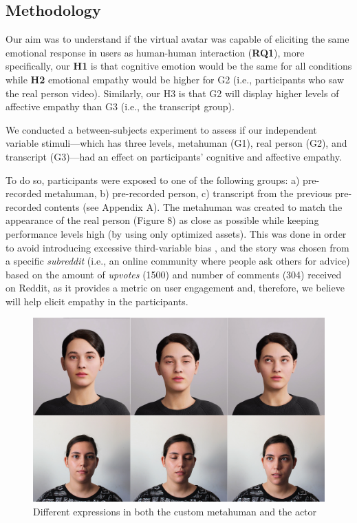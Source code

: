 \subsection{Methodology}
Our aim was to understand if the virtual avatar was capable of eliciting the same emotional response in users as human-human interaction (\textbf{RQ1}), more specifically, our \textbf{H1} is that cognitive emotion would be the same for all conditions while \textbf{H2} emotional empathy would be higher for G2 (i.e., participants who saw the real person video). Similarly, our H3 is that G2 will display higher levels of affective empathy than G3 (i.e., the transcript group).

We conducted a between-subjects experiment to assess if our independent variable stimuli---which has three levels, metahuman (G1), real person (G2), and transcript (G3)---had an effect on participants' cognitive and affective empathy.

To do so, participants were exposed to one of the following groups: a) pre-recorded metahuman, b) pre-recorded person, c) transcript from the previous pre-recorded contents (see Appendix A). The metahuman was created to match the appearance of the real person (Figure 8) as close as possible while keeping performance levels high (by using only optimized assets). This was done in order to avoid introducing excessive third-variable bias \cite{ROT19}, and the story was chosen from a specific \textit{subreddit} (i.e., an online community where people ask others for advice) based on the amount of \textit{upvotes} (1500) and number of comments (304) received on Reddit, as it provides a metric on user engagement and, therefore, we believe will help elicit empathy in the participants.

\begin{figure}[h!]
\includegraphics[width=\textwidth]{figures/personavatar.jpg}
\centering
\caption{Different expressions in both the custom metahuman and the actor}
\end{figure}

